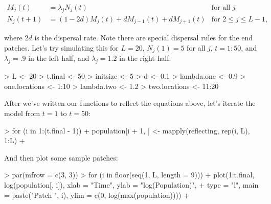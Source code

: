 \documentclass[10pt, oneside, reqno]{article}
\theoremstyle{plain}
\begin{document}
\begin{align}
	M_j(t) &=\lambda_j N_j(t) &\textrm{for all } j \\
	N_j(t+1) &= (1-2d)M_j(t)+dM_{j-1}(t)+dM_{j+1}(t) &\textrm{for } 2\leq j \leq L-1,
\end{align}

where $2d$ is the dispersal rate. Note there are special dispersal rules for the end patches. Let's try simulating this for $L=20$, $N_j(1)=5$ for all $j$, $t=1:50$, and $\lambda_j=.9$ in the left half, and $\lambda_j=1.2$ in the right half:

\begin{Schunk}
\begin{Sinput}
> L <- 20
> t.final <- 50
> initsize <- 5
> d <- 0.1
> lambda.one <- 0.9
> one.locations <- 1:10
> lambda.two <- 1.2
> two.locations <- 11:20
\end{Sinput}
\end{Schunk}


After we've written our functions to reflect the equations above, let's iterate the model from $t=1$ to $t=50$:

\begin{Schunk}
\begin{Sinput}
> for (i in 1:(t.final - 1)) {
+     population[i + 1, ] <- mapply(reflecting, rep(i, L), 1:L)
+ }
\end{Sinput}
\end{Schunk}

And then plot some sample patches:

\begin{Schunk}
\begin{Sinput}
> par(mfrow = c(3, 3))
> for (i in floor(seq(1, L, length = 9))) {
+     plot(1:t.final, log(population[, i]), xlab = "Time", ylab = "log(Population)", 
+         type = "l", main = paste("Patch ", i), ylim = c(0, log(max(population))))
+ }
\end{Sinput}
\end{Schunk}
\end{document}
